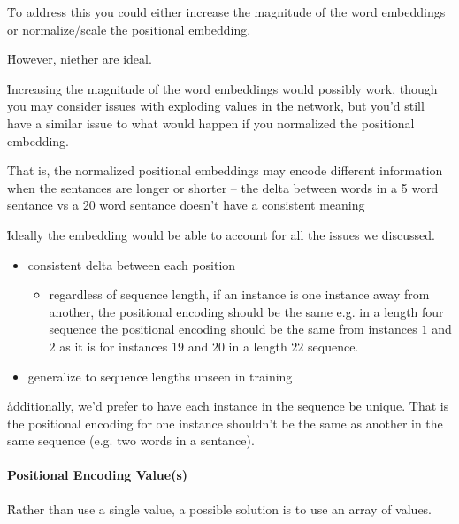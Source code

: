 \r{To address this you could either increase the magnitude of the word embeddings or normalize/scale the positional embedding.}

\r{However, niether are ideal.}

\r{Increasing the magnitude of the word embeddings would possibly work, though you may consider issues with exploding values in the network, but you'd still have a similar issue to what would happen if you normalized the positional embedding. }

\r{That is, the normalized positional embeddings may encode different information when the sentances are longer or shorter -- the delta between words in a 5 word sentance vs a 20 word sentance doesn't have a consistent meaning}


\r{Ideally the embedding would be able to account for all the issues we discussed.}

\begin{itemize}[noitemsep,topsep=0pt]
	\item consistent delta between each position
	\begin{itemize}[noitemsep,topsep=0pt]
		\item regardless of sequence length, if an instance is one instance away from another, the positional encoding should be the same e.g. in a length four sequence the positional encoding should be the same from instances $1$ and $2$ as it is for instances $19$ and $20$ in a length $22$ sequence.
	\end{itemize}
	\item generalize to sequence lengths unseen in training
\end{itemize}

\r{additionally, we'd prefer to have each instance in the sequence be unique. That is the positional encoding for one instance shouldn't be the same as another in the same sequence (e.g. two words in a sentance).}

\paragraph{Positional Encoding Value(s)}

\r{Rather than use a single value, a possible solution is to use an array of values.}



